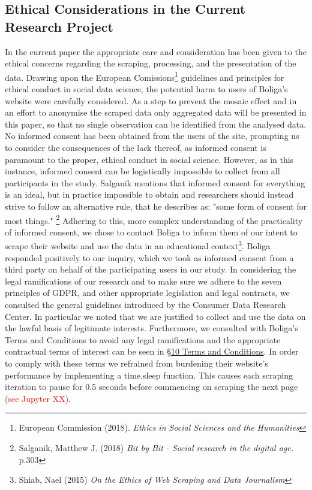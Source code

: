 \documentclass[12pt,a4paper]{article}
\begin{document}
\subsection{Ethical Considerations in the Current Research Project}
In the current paper the appropriate care and consideration has been given to the ethical concerns regarding the scraping, processing, and the presentation of the data. Drawing upon the European Comissions\footnote{European Commission (2018). \textit{Ethics in Social Sciences and the Humanities}} guidelines and principles for ethical conduct in social data science, the potential harm to users of Boliga's website were carefully considered. As a step to prevent the mosaic effect and in an effort to anonymise the scraped data only aggregated data will be presented in this paper, so that no single observation can be identified from the analysed data.\newline
No informed consent has been obtained from the users of the site, prompting us to consider the consequences of the lack thereof, as informed consent is paramount to the proper, ethical conduct in social science. However, as in this instance, informed consent can be logistically impossible to collect from all participants in the study. Salganik mentions that informed consent for everything is an ideal, but in practice impossible to obtain and researchers should instead strive to follow an alternative rule, that he describes as: "some form of consent for most things." \footnote{Salganik, Matthew J. (2018) \textit{Bit by Bit - Social research in the digital age.} p.303} Adhering to this, more complex understanding of the practicality of informed consent, we chose to contact Boliga to inform them of our intent to scrape their website and use the data in an educational context\footnote{Shiab, Nael (2015) \textit{On the Ethics of Web Scraping and Data Journalism}}. Boliga responded positively to our inquiry, which we took as informed consent from a third party on behalf of the participating users in our study.\newline
In considering the legal ramifications of our research and to make sure we adhere to the seven principles of GDPR, and other appropriate legislation and legal contracts, we consulted the general guidelines introduced by the Consumer Data Research Center. In particular we noted that we are justified to collect and use the data on the lawful basis of legitimate interests. Furthermore, we consulted with Boliga's Terms and Conditions to avoid any legal ramifications and the appropriate contractual terms of interest can be seen in \href{https://www.boliga.dk/vilkaar-og-betingelser}{§10 Terms and Conditions}. In order to comply with these terms we refrained from burdening their website's performance by implementing a time.sleep function. This causes each scraping iteration to pause for 0.5 seconds before commencing on scraping the next page \textcolor{red}{(see Jupyter XX)}. 
\end{document}
